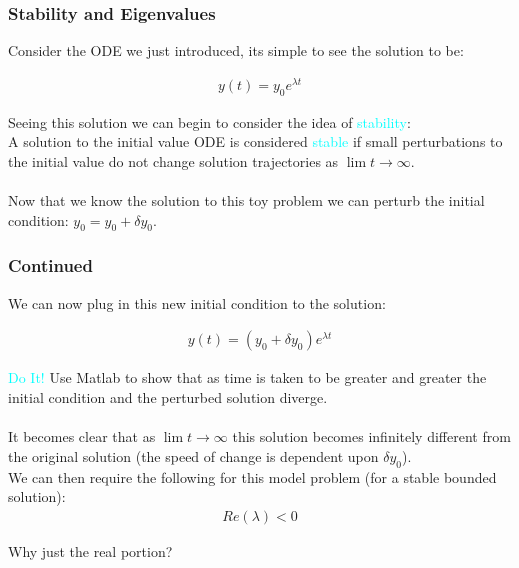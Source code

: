\documentclass{beamer}
\begin{document}
\begin{frame}
\frametitle{Stability and Eigenvalues}

Consider the ODE we just introduced, its simple to see the solution to be: 

\begin{align*}
y(t) = y_0e^{\lambda t}
\end{align*}

Seeing this solution we can begin to consider the idea of \textcolor{cyan}{stability}: \\

A solution to the initial value ODE  is considered \textcolor{cyan}{stable} if small perturbations to the initial value do not change solution trajectories as $\lim t \rightarrow \infty$. \\ 
\ \\
Now that we know the solution to this toy problem we can perturb the initial condition: $ y_0 = y_0 + \delta y_0$. 


\end{frame}



\begin{frame}
\frametitle{Continued} 

We can now plug in this new initial condition to the solution: 

\begin{align*}
y(t) = (y_0+\delta y_0)e^{\lambda t}
\end{align*}

\textcolor{cyan}{Do It!} Use Matlab to show that as time is taken to be greater and greater the initial condition and the perturbed solution diverge.\\
\ \\
It becomes clear that as $\lim t \rightarrow \infty$ this solution becomes infinitely different from the original solution (the speed of change is dependent upon $\delta y_0$). \\
We can then require the following for this model problem (for a stable bounded solution): 
\begin{align*}
Re(\lambda) < 0
\end{align*}

Why just the real portion? 
 
\end{frame}
\end{document}
